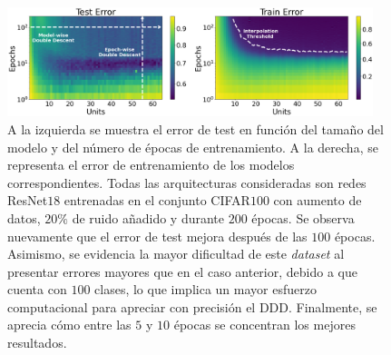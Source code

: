 \begin{figure}[h]
    \centering
    \includegraphics[width=0.95\textwidth]{img/experiments/model-epochPreActResNet18CIFAR100augmented.png}
    \caption[Doble descenso en función del tamaño del modelo y del número de épocas para la red ResNet$18$ y el conjunto CIFAR$100$.]{A la izquierda se muestra el error de test en función del tamaño del modelo y del número de épocas de entrenamiento. A la derecha, se representa el error de entrenamiento de los modelos correspondientes. Todas las arquitecturas consideradas son redes ResNet$18$ entrenadas en el conjunto CIFAR$100$ con aumento de datos, $20\%$ de ruido añadido y durante $200$ épocas. Se observa nuevamente que el error de test mejora después de las $100$ épocas. Asimismo, se evidencia la mayor dificultad de este \textit{dataset} al presentar errores mayores que en el caso anterior, debido a que cuenta con $100$ clases, lo que implica un mayor esfuerzo computacional para apreciar con precisión el DDD. Finalmente, se aprecia cómo entre las $5$ y $10$ épocas se concentran los mejores resultados.}\label{fig:model-epochPreActResNet18CIFAR100}
\end{figure}

